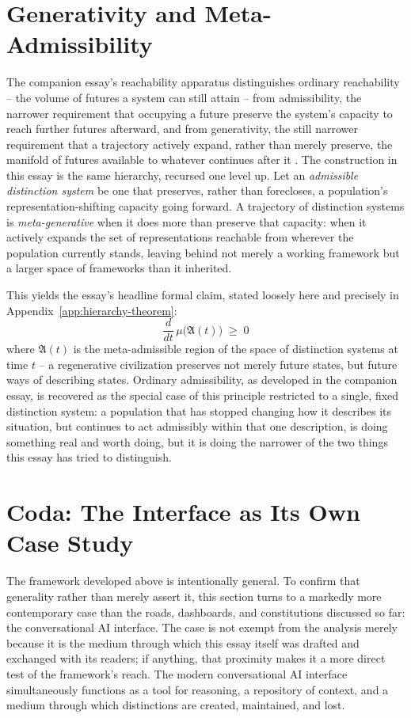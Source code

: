 \documentclass[11pt]{article}
\theoremstyle{plain}
\begin{document}
\section{Generativity and Meta-Admissibility}
\label{sec:generativity-admissibility}

The companion essay's reachability apparatus distinguishes ordinary reachability -- the volume of futures a system can still attain -- from admissibility, the narrower requirement that occupying a future preserve the system's capacity to reach further futures afterward, and from generativity, the still narrower requirement that a trajectory actively expand, rather than merely preserve, the manifold of futures available to whatever continues after it \cite{flyxion2026cone}. The construction in this essay is the same hierarchy, recursed one level up. Let an \emph{admissible distinction system} be one that preserves, rather than forecloses, a population's representation-shifting capacity going forward. A trajectory of distinction systems is \emph{meta-generative} when it does more than preserve that capacity: when it actively expands the set of representations reachable from wherever the population currently stands, leaving behind not merely a working framework but a larger space of frameworks than it inherited.

This yields the essay's headline formal claim, stated loosely here and precisely in Appendix~\ref{app:hierarchy-theorem}:
\[
\boxed{\frac{d}{dt}\,\mu\big(\mathfrak{A}(t)\big) \;\geq\; 0}
\]
where $\mathfrak{A}(t)$ is the meta-admissible region of the space of distinction systems at time $t$ -- a regenerative civilization preserves not merely future states, but future ways of describing states. Ordinary admissibility, as developed in the companion essay, is recovered as the special case of this principle restricted to a single, fixed distinction system: a population that has stopped changing how it describes its situation, but continues to act admissibly within that one description, is doing something real and worth doing, but it is doing the narrower of the two things this essay has tried to distinguish.

\section{Coda: The Interface as Its Own Case Study}
\label{sec:coda}

The framework developed above is intentionally general. To confirm that generality rather than merely assert it, this section turns to a markedly more contemporary case than the roads, dashboards, and constitutions discussed so far: the conversational AI interface. The case is not exempt from the analysis merely because it is the medium through which this essay itself was drafted and exchanged with its readers; if anything, that proximity makes it a more direct test of the framework's reach. The modern conversational AI interface simultaneously functions as a tool for reasoning, a repository of context, and a medium through which distinctions are created, maintained, and lost.
\end{document}
